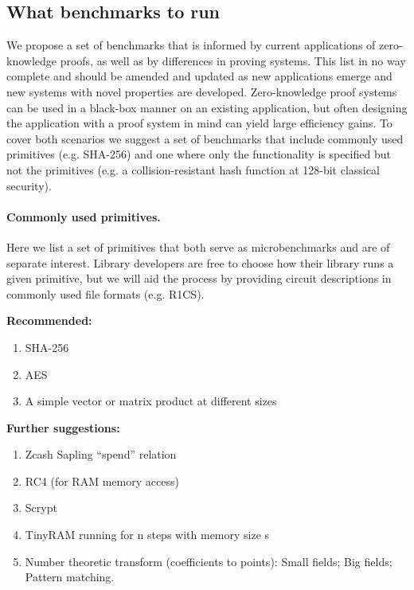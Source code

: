 \subsection{What benchmarks to run}
We propose a set of benchmarks that is informed by current applications of zero-knowledge proofs, as well as by differences in proving systems. This list in no way complete and should be amended and updated as new applications emerge and new systems with novel properties are developed. Zero-knowledge proof systems can be used in a black-box manner on an existing application, but often designing the application with a proof system in mind can yield large efficiency gains. To cover both scenarios we suggest a set of benchmarks that include commonly used primitives (e.g. SHA-256) and one where only the functionality is specified but not the primitives (e.g. a collision-resistant hash function at 128-bit classical security). 


\paragraph{Commonly used primitives.}

Here we list a set of primitives that both serve as microbenchmarks and are of separate interest. Library developers are free to choose how their library runs a given primitive, but we will aid the process by providing circuit descriptions in commonly used file formats (e.g. R1CS). 


\textbf{Recommended:}
\begin{enumerate}
    \item SHA-256
    \item AES
    \item A simple vector or matrix product at different sizes
\end{enumerate}

\textbf{Further suggestions:}
\begin{enumerate}[label={- }]
    \item Zcash Sapling “spend” relation
    \item RC4 (for RAM memory access)
    \item Scrypt
    \item TinyRAM running for n steps with memory size s 
    \item Number theoretic transform (coefficients to points):
        Small fields;
        Big fields;
        Pattern matching.
\end{enumerate}


